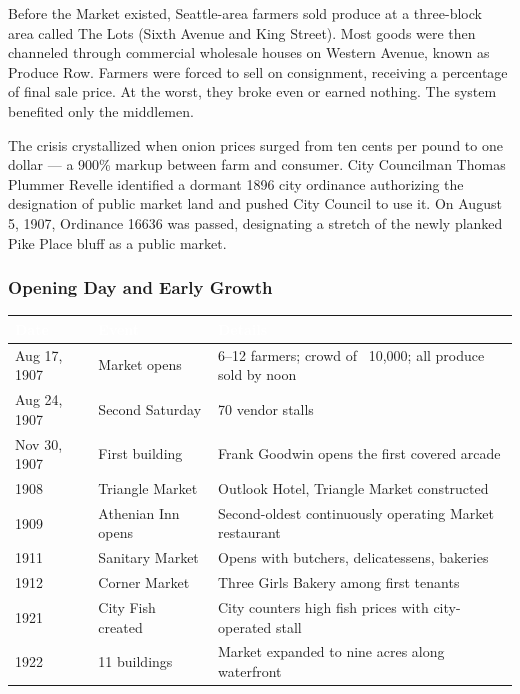 \documentclass[11pt,letterpaper]{article}
\newcommand{\tableheader}[1]{\textbf{\sffamily\textcolor{white}{#1}}}
\begin{document}
Before the Market existed, Seattle-area farmers sold produce at a three-block area called The Lots (Sixth Avenue and King Street). Most goods were then channeled through commercial wholesale houses on Western Avenue, known as Produce Row. Farmers were forced to sell on consignment, receiving a percentage of final sale price. At the worst, they broke even or earned nothing. The system benefited only the middlemen.

The crisis crystallized when onion prices surged from ten cents per pound to one dollar --- a 900\% markup between farm and consumer. City Councilman Thomas Plummer Revelle identified a dormant 1896 city ordinance authorizing the designation of public market land and pushed City Council to use it. On August 5, 1907, Ordinance 16636 was passed, designating a stretch of the newly planked Pike Place bluff as a public market.

\subsubsection{Opening Day and Early Growth}

\begin{center}
\begin{tabularx}{\textwidth}{C{2.5cm}L{3cm}X}
\toprule
{}
\tableheader{Date} & \tableheader{Event} & \tableheader{Details} \\
\midrule
Aug 17, 1907 & Market opens & 6--12 farmers; crowd of ~10,000; all produce sold by noon \\
Aug 24, 1907 & Second Saturday & 70 vendor stalls \\
Nov 30, 1907 & First building & Frank Goodwin opens the first covered arcade \\
1908 & Triangle Market & Outlook Hotel, Triangle Market constructed \\
1909 & Athenian Inn opens & Second-oldest continuously operating Market restaurant \\
1911 & Sanitary Market & Opens with butchers, delicatessens, bakeries \\
1912 & Corner Market & Three Girls Bakery among first tenants \\
1921 & City Fish created & City counters high fish prices with city-operated stall \\
1922 & 11 buildings & Market expanded to nine acres along waterfront \\
\bottomrule
\end{tabularx}
\end{center}
\end{document}

